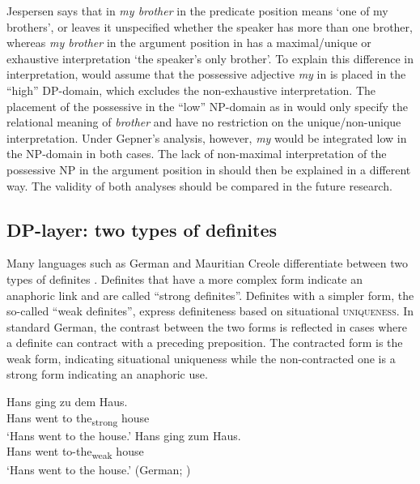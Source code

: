 \documentclass[output=paper,
colorlinks,
citecolor=brown,
newtxmath
]{langscibook}
\begin{document}
\noindent Jespersen says that in  \textit{my brother} in the predicate position means `one of my brothers', or leaves it unspecified whether the speaker has more than one brother, whereas \textit{my brother} in the argument position in  has a maximal/unique or exhaustive interpretation `the speaker’s only brother'. To explain this difference in interpretation, \cite{Kagan.Pereltsvaig2014} would assume that the possessive adjective \textit{my} in  is placed in the ``high'' DP-domain, which excludes the non-ex\-haustive interpretation. The placement of the possessive in the ``low'' NP-domain as in  would only specify the relational meaning of \textit{brother} and have no restriction on the unique/non-unique interpretation. Under Gepner's analysis, however, \textit{my} would be integrated low in the NP-domain in both cases. The lack of non-maximal interpretation of the possessive NP in the argument position in  should then be explained in a different way. The validity of both analyses should be compared in the future research.

\subsection{DP-layer: two types of definites}

Many languages such as German and Mauritian Creole differentiate between two types of definites \citep{Löbner2011,Schwarz2009,Schwarz2013,Jenks2015}. Definites that have a more complex form indicate an anaphoric link and are called ``strong definites''. Definites with a simpler form, the so-called ``weak definites'', express definiteness based on situational \textsc{uniqueness}. In standard German, the contrast between the two forms is reflected in cases where a definite can contract with a preceding preposition. The contracted form is the weak form, indicating situational uniqueness while the non-contracted one is a strong form indicating an anaphoric use.


\ea \label{ex:7}
\ea
\gll Hans ging zu dem Haus. \\
    Hans went to the\textsubscript{strong} house\\ %
\glt `Hans went to the house.' \label{ex:7a}
\ex \gll Hans ging zum Haus. \\
 Hans went to-the\textsubscript{weak} house\\ %
\glt `Hans went to the house.' \hfill (German; \citealt[12]{Schwarz2009}) \label{ex:7b}
\z \z
\end{document}
